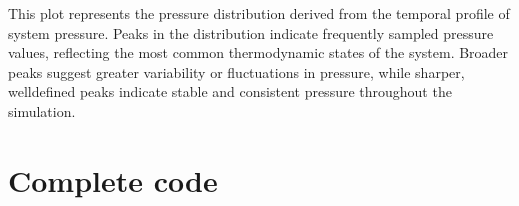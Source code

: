 \documentclass[a4paper,10pt,english]{sphinxmanual}
\begin{document}
\sphinxAtStartPar
{} This plot represents the pressure distribution derived from the temporal profile of system pressure. Peaks in the distribution indicate frequently sampled pressure values, reflecting the most common thermodynamic states of the system. Broader peaks suggest greater variability or fluctuations in pressure, while sharper, well\sphinxhyphen{}defined peaks indicate stable and consistent pressure throughout the simulation.


\section{Complete code}
\label{\detokenize{Pressure:complete-code}}
\begin{sphinxVerbatim}[commandchars=\\\{\}]
 
\end{sphinxVerbatim}

\begin{sphinxVerbatim}[commandchars=\\\{\}]
\end{sphinxVerbatim}
\end{document}
